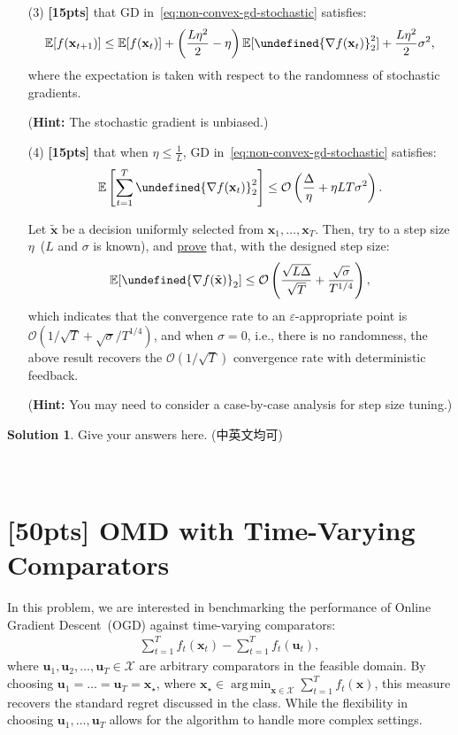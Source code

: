 \documentclass[a4paper]{article}
\numberwithin{equation}{section}
\theoremstyle{definition}
\newtheorem*{solution}{Solution}
\DeclareMathOperator*{\argmin}{arg\,min}
\theoremstyle{definition}
\def \E {\mathbb{E}}
\def \X {\mathcal{X}}
\def \O {\mathcal{O}}
\def \u {\textbf{u}}
\def \x {\textbf{x}}
\def \xs {\x_\star}
\def \xt {\tilde{\x}}
\let\norm\undefined
\let\epsilon\varepsilon
\DeclarePairedDelimiter\norm{\lVert}{\rVert}
\begin{document}
\begin{enumerate}
  \item[(3)] \textbf{[15pts]}  that GD in~\eqref{eq:non-convex-gd-stochastic} satisfies:
  \begin{align*}
    \E[f(\x_{t+1})] \leq \E[f(\x_t)] + \left(\frac{L \eta^2}{2} - \eta\right) \E[\norm{\nabla f(\x_t)}_2^2] + \frac{L\eta^2}{2}\sigma^2,
  \end{align*}
  where the expectation is taken with respect to the randomness of stochastic gradients.

  (\textbf{Hint:} The stochastic gradient is unbiased.)
  \item[(4)] \textbf{[15pts]}  that when $\eta \leq \frac{1}{L}$, GD in~\eqref{eq:non-convex-gd-stochastic} satisfies:
    \begin{align*}
      \E\left[\sum_{t=1}^T\norm{\nabla f(\x_t)}_2^2\right]\leq \O\left(  \frac{\Delta}{\eta} + \eta LT\sigma^2 \right).
    \end{align*}
    
    Let $\xt$ be a decision uniformly selected from $\x_1, \dots, \x_T$. Then, try to  a step size $\eta$~($L$ and $\sigma$ is known), and \underline{prove} that, with the designed step size:
    \begin{align*}
     \E[\norm{\nabla f(\xt)}_2] \leq \O \left(\frac{\sqrt{L\Delta}}{\sqrt{T}} + \frac{\sqrt{\sigma}}{T^{1/4}}\right),
    \end{align*}
    which indicates that the convergence rate to an $\epsilon$-appropriate point is $\O(1/\sqrt{T} + \sqrt{\sigma}/T^{1/4})$, and when $\sigma = 0$, i.e., there is no randomness, the above result recovers the $\O(1/\sqrt{T})$ convergence rate with deterministic feedback.

    (\textbf{Hint:} You may need to consider a case-by-case analysis for step size tuning.)
\end{enumerate}
\begin{solution}
  Give your answers here. (中英文均可)
  ~\\
  ~\\
  ~\\
\end{solution}

\newpage
\section{[50pts] OMD with Time-Varying Comparators}
In this problem, we are interested in benchmarking the performance of Online Gradient Descent~(OGD) against time-varying comparators:
\begin{align*}
   \sum_{t=1}^T f_t(\x_t) - \sum_{t=1}^T f_t(\u_t),
\end{align*}
where $\u_1, \u_2, \dots, \u_T\in \X$ are arbitrary comparators in the feasible domain. By choosing $\u_1 = \dots = \u_T = \xs$, where $\xs \in \argmin_{\x \in \X} \sum_{t=1}^T f_t(\x)$, this measure recovers the standard regret discussed in the class. While the flexibility in choosing $\u_1, \dots, \u_T$ allows for the algorithm to handle more complex settings. 
\end{document}
